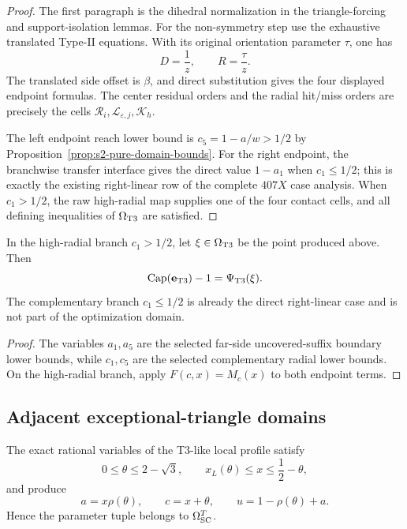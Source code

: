\begin{proof}
The first paragraph is the dihedral normalization in the triangle-forcing and
support-isolation lemmas.  For the non-symmetry step use the exhaustive
translated Type-II equations.  With its original orientation parameter
\(\tau\), one has
\[
 D=\frac1z,\qquad R=\frac{\tau}{z}.
\]
The translated side offset is \(\beta\), and direct substitution gives the
four displayed endpoint formulas.  The center residual orders and the radial
hit/miss orders are precisely the cells
\(\mathcal R_i,\mathcal L_{\varepsilon,j},\mathcal K_h\).

The left endpoint reach lower bound is $c_5=1-a/w>1/2$ by
Proposition~\ref{prop:s2-pure-domain-bounds}.  For the right endpoint, the
branchwise transfer interface gives the direct value $1-a_1$ when
$c_1\le1/2$; this is exactly the existing right-linear row of the complete
$407X$ case analysis.  When $c_1>1/2$, the raw high-radial map supplies one of the
four contact cells, and all defining inequalities of
$\Omega_{\rm T3}$ are satisfied.
\end{proof}

\begin{proposition}
\label{prop:s2-t3-objective-bridge}
In the high-radial branch $c_1>1/2$, let
$\xi\in\Omega_{\rm T3}$ be the point produced above.  Then
\[
 \mathrm{Cap}(\mathbf e_{\rm T3})-1
 =\Psi_{\rm T3}(\xi).
\]
The complementary branch $c_1\le1/2$ is already the direct right-linear case
and is not part of the optimization domain.
\end{proposition}

\begin{proof}
The variables \(a_1,a_5\) are the selected far-side uncovered-suffix
boundary lower bounds, while \(c_1,c_5\) are the selected complementary
radial lower bounds.  On the high-radial branch,
apply \(F(c,x)=M_c(x)\) to both endpoint terms.
\end{proof}

\subsection{Adjacent exceptional-triangle domains}

\begin{proposition}
\label{prop:s2-sc-t3-bridge}
The exact rational variables of the T3-like local profile satisfy
\[
 0\le\theta\le2-\sqrt3,\qquad
 x_L(\theta)\le x\le\frac12-\theta,
\]
and produce
\[
 a=x\rho(\theta),\qquad
 c=x+\theta,\qquad
 u=1-\rho(\theta)+a.
\]
Hence the parameter tuple belongs to \(\Omega_{\rm SC}^{T}\).
\end{proposition}

